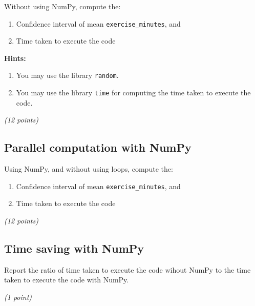 \documentclass[
  letterpaper,
  DIV=11,
  numbers=noendperiod]{scrreprt}
\providecommand{\tightlist}{%
  \setlength{\itemsep}{0pt}\setlength{\parskip}{0pt}}\usepackage{longtable,booktabs,array}
\begin{document}
Without using NumPy, compute the:

\begin{enumerate}
\def\labelenumi{\arabic{enumi}.}
\item
  Confidence interval of mean \texttt{exercise\_minutes}, and
\item
  Time taken to execute the code
\end{enumerate}

\textbf{Hints:}

\begin{enumerate}
\def\labelenumi{\arabic{enumi}.}
\item
  You may use the library \texttt{random}.
\item
  You may use the library \texttt{time} for computing the time taken to
  execute the code.
\end{enumerate}

\emph{(12 points)}

\hypertarget{parallel-computation-with-numpy}{%
\subsection{Parallel computation with
NumPy}\label{parallel-computation-with-numpy}}

Using NumPy, and without using loops, compute the:

\begin{enumerate}
\def\labelenumi{\arabic{enumi}.}
\tightlist
\item
  Confidence interval of mean \texttt{exercise\_minutes}, and
\item
  Time taken to execute the code
\end{enumerate}

\emph{(12 points)}

\hypertarget{time-saving-with-numpy}{%
\subsection{Time saving with NumPy}\label{time-saving-with-numpy}}

Report the ratio of time taken to execute the code wihout NumPy to the
time taken to execute the code with NumPy.

\emph{(1 point)}
\end{document}
